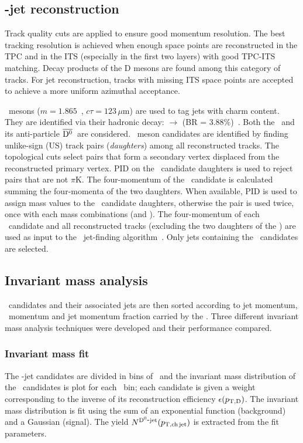 \documentclass[a4paper]{jpconf}
\begin{document}
\subsection{\Dzero-jet reconstruction}
Track quality cuts are applied to ensure good momentum resolution. 
The best tracking resolution is achieved when enough space points are reconstructed in the TPC and in the ITS (especially in the first two layers)
with good TPC-ITS matching.
Decay products of the D mesons are found among this category of tracks.
For jet reconstruction, tracks with missing ITS space points are accepted to achieve a more uniform azimuthal acceptance.

\Dzero\ mesons ($m=1.865$~\GeVcsq, $c\tau=123\,\mu$m) are used to tag jets with charm content.
They are identified via their hadronic decay: \Dzero $\rightarrow$ \pip \kam (BR = 3.88\%)~\cite{PDG:2014}. Both the \Dzero\ and its
anti-particle $\overline{\mathrm{D^{0}}}$~are considered.
\Dzero\ meson candidates are identified by finding unlike-sign (US) track pairs (\emph{daughters}) among all reconstructed tracks.
The topological cuts select pairs that form a secondary vertex displaced from the reconstructed
primary vertex. PID on the \Dzero\ candidate daughters is used to reject pairs that are not $\pi$K.
The four-momentum of the \Dzero\ candidate is calculated summing the four-momenta of the two daughters.
When available, PID is used to assign mass values to the \Dzero\ candidate daughters, otherwise
the pair is used twice, once with each mass combinations (\pip \kam and \pim \kap). 
The four-momentum of each \Dzero\ candidate and all reconstructed tracks
(excluding the two daughters of the \Dzero) are used as input to the \antikt\ jet-finding algorithm~\cite{Cacciari:2008c}.
Only jets containing the \Dzero\ candidates are selected.

\subsection{Invariant mass analysis}
\Dzero\ candidates and their associated jets are then sorted according to jet momentum, \Dzero\ momentum and jet momentum
fraction carried by the \Dzero.
Three different invariant mass analysis techniques were developed and their performance compared.
\subsubsection*{Invariant mass fit}
The \Dzero-jet candidates are divided in bins of \ptchjet\ and the invariant mass distribution of the \Dzero\ candidates is plot for each \ptchjet\ bin;
each candidate is given a weight corresponding to the inverse of its reconstruction efficiency $\epsilon(p_{\mathrm{T,D}})$.
The invariant mass distribution is fit using the sum of an exponential function (background) and a Gaussian (signal). The yield $N^{\rm \mathrm{D^{0}}\hbox{-}jet}(p_{\mathrm{T,ch\, jet}})$ is extracted from
the fit parameters.
\end{document}
